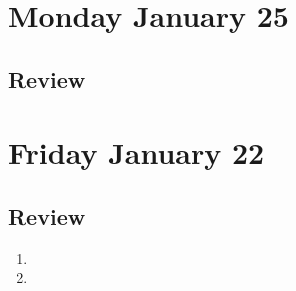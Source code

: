 

\section*{Monday January 25}
% 
% 
% 
% 
\newpage





% 
% 

\newpage
\subsection*{Review}

\newpage

\section*{Friday January 22}



\newpage

\newpage

\subsection*{Review}
\begin{enumerate}
\item 
\item 
\end{enumerate}



